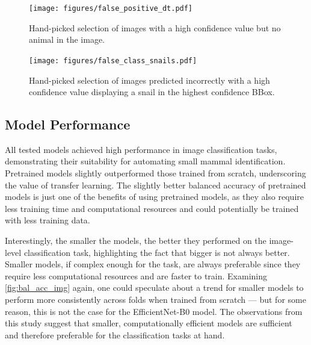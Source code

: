\begin{figure}[ht]
\centering
\texttt{[image: figures/false\_positive\_dt.pdf]}
\caption{Hand-picked selection of images with a high confidence value but no animal in the image.}
\label{fig:false_positive_dt}
\end{figure}

\begin{figure}[ht]
\centering
\texttt{[image: figures/false\_class\_snails.pdf]}
\caption{Hand-picked selection of images predicted incorrectly with a high confidence value displaying a snail in the highest confidence BBox.}
\label{fig:false_class_snails}
\end{figure}

\subsection{Model Performance}
All tested models achieved high performance in image classification tasks, demonstrating their suitability for automating small mammal identification.
Pretrained models slightly outperformed those trained from scratch, underscoring the value of transfer learning.
The slightly better balanced accuracy of pretrained models is just one of the benefits of using pretrained models, as they also require less training time and computational resources and could potentially be trained with less training data.

Interestingly, the smaller the models, the better they performed on the image-level classification task, highlighting the fact that bigger is not always better.
Smaller models, if complex enough for the task, are always preferable since they require less computational resources and are faster to train.
Examining \autoref{fig:bal_acc_img} again, one could speculate about a trend for smaller models to perform more consistently across folds when trained from scratch --- but for some reason, this is not the case for the EfficientNet-B0 model.
The observations from this study suggest that smaller, computationally efficient models are sufficient and therefore preferable for the classification tasks at hand.

